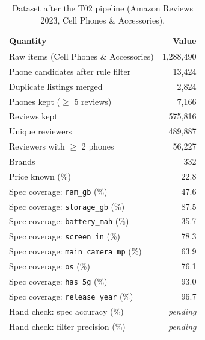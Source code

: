 \begin{table}[t]
\centering
\small
\begin{tabular}{lr}
\toprule
Quantity & Value \\
\midrule
Raw items (Cell Phones \& Accessories) & 1,288,490 \\
Phone candidates after rule filter & 13,424 \\
Duplicate listings merged & 2,824 \\
Phones kept ($\geq$ 5 reviews) & 7,166 \\
Reviews kept & 575,816 \\
Unique reviewers & 489,887 \\
Reviewers with $\geq$ 2 phones & 56,227 \\
Brands & 332 \\
Price known (\%) & 22.8 \\
Spec coverage: \texttt{ram\_gb} (\%) & 47.6 \\
Spec coverage: \texttt{storage\_gb} (\%) & 87.5 \\
Spec coverage: \texttt{battery\_mah} (\%) & 35.7 \\
Spec coverage: \texttt{screen\_in} (\%) & 78.3 \\
Spec coverage: \texttt{main\_camera\_mp} (\%) & 63.9 \\
Spec coverage: \texttt{os} (\%) & 76.1 \\
Spec coverage: \texttt{has\_5g} (\%) & 93.0 \\
Spec coverage: \texttt{release\_year} (\%) & 96.7 \\
Hand check: spec accuracy (\%) & \textit{pending} \\
Hand check: filter precision (\%) & \textit{pending} \\
\bottomrule
\end{tabular}
\caption{Dataset after the T02 pipeline (Amazon Reviews 2023, Cell Phones \& Accessories).}
\label{tab:dataset}
\end{table}
